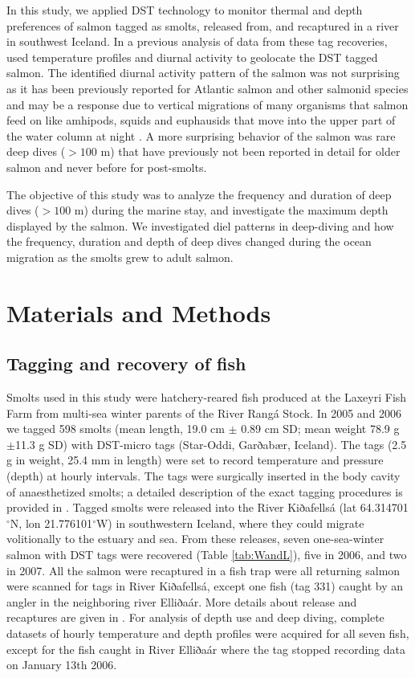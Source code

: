 In this study, we applied DST technology to monitor thermal and depth preferences of salmon tagged as smolts, released from, and recaptured in a river in southwest Iceland. 
In a previous analysis of data from these tag recoveries, \cite{Gudjonsson2015} used temperature profiles and diurnal activity to geolocate the DST tagged salmon.  
The identified diurnal activity pattern of the salmon was not surprising as it has been previously reported for Atlantic salmon and other salmonid species \citep{Reddin2011,Rikardsen2007,Walker2000} and may be a response due to vertical migrations of many organisms that salmon feed on like amhipods, squids and euphausids that move into the upper part of the water column at night \citep{Pearchy1984,Davis1998}.  
A more surprising behavior of the salmon was rare deep dives ($>100$ m) that have previously not been reported in detail for older salmon and never before for post-smolts.

The objective of this study was to analyze the frequency and duration of deep dives ($>100$ m) during the marine stay, and investigate the maximum depth displayed by the salmon. We investigated diel patterns in deep-diving and how the frequency, duration and depth of deep dives changed during the ocean migration as the smolts grew to adult salmon.

\section{Materials and Methods}
\label{MnM}
\subsection{Tagging and recovery of fish}
Smolts used in this study were hatchery-reared fish produced at the Laxeyri Fish Farm from multi-sea winter parents of the River Rangá Stock. 
In 2005 and 2006 we tagged 598 smolts (mean length, 19.0 cm $\pm$ 0.89 cm SD; mean weight 78.9 g $\pm$11.3 g SD) with DST-micro tags (Star-Oddi, Garðabær, Iceland). 
The tags (2.5 g in weight, 25.4 mm in length) were set to record temperature and pressure (depth) at hourly intervals. 
The tags were surgically inserted in the body cavity of anaesthetized smolts; a detailed description of the exact tagging procedures is provided in \cite{Gudjonsson2015}. 
Tagged smolts were released into the River Kiðafellsá (lat 64.314701$^\circ$N, lon 21.776101$^\circ$W) in southwestern Iceland, where they could migrate volitionally to the estuary and sea. 
From these releases, seven one-sea-winter salmon with DST tags were recovered (Table \ref{tab:WandL}), five in 2006, and two in 2007. 
All the salmon were recaptured in a fish trap were all returning salmon  were scanned for tags in River Kiðafellsá, except one fish (tag 331) caught by an angler in the neighboring river Elliðaár. 
More details about release and recaptures are given in \cite{Gudjonsson2015}.
For analysis of depth use and deep diving, complete datasets of hourly temperature and depth profiles were acquired for all seven fish, except for the fish caught in River Elliðaár where the tag stopped recording data on January 13th 2006.

